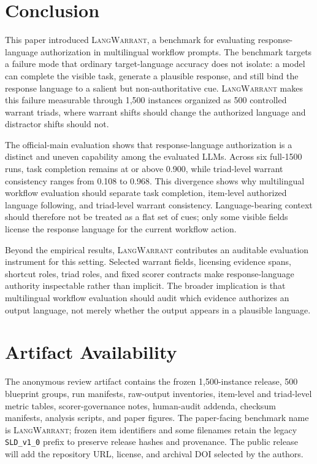 \documentclass[10pt,conference]{IEEEtran}
\newcommand{\dataset}{\textsc{LangWarrant}}
\begin{document}
\section{Conclusion}

This paper introduced \dataset{}, a benchmark for evaluating response-language authorization in multilingual workflow prompts. The benchmark targets a failure mode that ordinary target-language accuracy does not isolate: a model can complete the visible task, generate a plausible response, and still bind the response language to a salient but non-authoritative cue. \dataset{} makes this failure measurable through 1,500 instances organized as 500 controlled warrant triads, where warrant shifts should change the authorized language and distractor shifts should not.

The official-main evaluation shows that response-language authorization is a distinct and uneven capability among the evaluated LLMs. Across six full-1500 runs, task completion remains at or above 0.900, while triad-level warrant consistency ranges from 0.108 to 0.968. This divergence shows why multilingual workflow evaluation should separate task completion, item-level authorized language following, and triad-level warrant consistency. Language-bearing context should therefore not be treated as a flat set of cues; only some visible fields license the response language for the current workflow action.

Beyond the empirical results, \dataset{} contributes an auditable evaluation instrument for this setting. Selected warrant fields, licensing evidence spans, shortcut roles, triad roles, and fixed scorer contracts make response-language authority inspectable rather than implicit. The broader implication is that multilingual workflow evaluation should audit which evidence authorizes an output language, not merely whether the output appears in a plausible language.


\section*{Artifact Availability}

The anonymous review artifact contains the frozen 1,500-instance release, 500 blueprint groups, run manifests, raw-output inventories, item-level and triad-level metric tables, scorer-governance notes, human-audit addenda, checksum manifests, analysis scripts, and paper figures. The paper-facing benchmark name is \dataset{}; frozen item identifiers and some filenames retain the legacy \texttt{SLD\_v1\_0} prefix to preserve release hashes and provenance. The public release will add the repository URL, license, and archival DOI selected by the authors.
\end{document}
